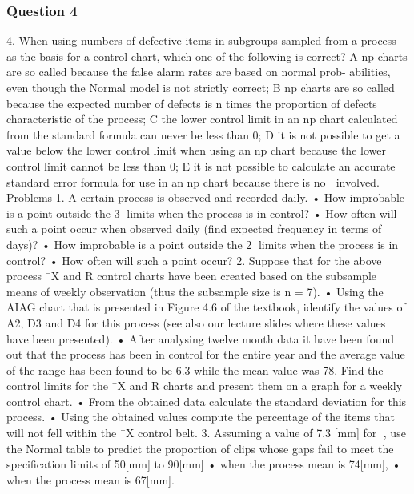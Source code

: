 \subsubsection*{Question 4}
4. When using numbers of defective items in subgroups sampled from a process as the
basis for a control chart, which one of the following is correct?
A np charts are so called because the false alarm rates are based on normal prob-
abilities, even though the Normal model is not strictly correct;
B np charts are so called because the expected number of defects is n times the
proportion of defects characteristic of the process;
C the lower control limit in an np chart calculated from the standard formula can
never be less than 0;
D it is not possible to get a value below the lower control limit when using an np
chart because the lower control limit cannot be less than 0;
E it is not possible to calculate an accurate standard error formula for use in an np
chart because there is no  involved.
Problems
1. A certain process is observed and recorded daily.
• How improbable is a point outside the 3 limits when the process is in control?
• How often will such a point occur when observed daily (find expected frequency
in terms of days)?
• How improbable is a point outside the 2 limits when the process is in control?
• How often will such a point occur?
2. Suppose that for the above process ¯X and R control charts have been created based
on the subsample means of weekly observation (thus the subsample size is n = 7).
• Using the AIAG chart that is presented in Figure 4.6 of the textbook, identify
the values of A2, D3 and D4 for this process (see also our lecture slides where
these values have been presented).
• After analysing twelve month data it have been found out that the process has
been in control for the entire year and the average value of the range has been
found to be 6.3 while the mean value was 78. Find the control limits for the
¯X
and R charts and present them on a graph for a weekly control chart.
• From the obtained data calculate the standard deviation for this process.
• Using the obtained values compute the percentage of the items that will not
fell within the ¯X control belt.
3. Assuming a value of 7.3 [mm] for , use the Normal table to predict the proportion
of clips whose gaps fail to meet the specification limits of 50[mm] to 90[mm]
• when the process mean is 74[mm],
• when the process mean is 67[mm].
